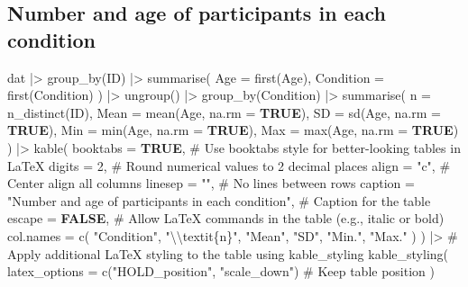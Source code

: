 \documentclass[
  bookmarksnumbered]{article}
\newenvironment{Shaded}{\begin{snugshade}}{\end{snugshade}}
\newcommand{\AttributeTok}[1]{\textcolor[rgb]{0.80,0.80,0.80}{#1}}
\newcommand{\CommentTok}[1]{\textcolor[rgb]{0.50,0.62,0.50}{#1}}
\newcommand{\ConstantTok}[1]{\textcolor[rgb]{0.86,0.64,0.64}{\textbf{#1}}}
\newcommand{\DecValTok}[1]{\textcolor[rgb]{0.86,0.86,0.80}{#1}}
\newcommand{\FunctionTok}[1]{\textcolor[rgb]{0.94,0.94,0.56}{#1}}
\newcommand{\NormalTok}[1]{\textcolor[rgb]{0.80,0.80,0.80}{#1}}
\newcommand{\SpecialCharTok}[1]{\textcolor[rgb]{0.86,0.64,0.64}{#1}}
\newcommand{\StringTok}[1]{\textcolor[rgb]{0.80,0.58,0.58}{#1}}
\begin{document}
\subsection{Number and age of participants in each condition}\label{number-and-age-of-participants-in-each-condition}

\begin{Shaded}
\begin{Highlighting}[]
\NormalTok{dat }\SpecialCharTok{|\textgreater{}}
  \FunctionTok{group\_by}\NormalTok{(ID) }\SpecialCharTok{|\textgreater{}}
  \FunctionTok{summarise}\NormalTok{(}
    \AttributeTok{Age =} \FunctionTok{first}\NormalTok{(Age),}
    \AttributeTok{Condition =} \FunctionTok{first}\NormalTok{(Condition)}
\NormalTok{  ) }\SpecialCharTok{|\textgreater{}}
  \FunctionTok{ungroup}\NormalTok{() }\SpecialCharTok{|\textgreater{}}
  \FunctionTok{group\_by}\NormalTok{(Condition) }\SpecialCharTok{|\textgreater{}}
  \FunctionTok{summarise}\NormalTok{(}
    \AttributeTok{n =} \FunctionTok{n\_distinct}\NormalTok{(ID),}
    \AttributeTok{Mean =} \FunctionTok{mean}\NormalTok{(Age, }\AttributeTok{na.rm =} \ConstantTok{TRUE}\NormalTok{),}
    \AttributeTok{SD =} \FunctionTok{sd}\NormalTok{(Age, }\AttributeTok{na.rm =} \ConstantTok{TRUE}\NormalTok{),}
    \AttributeTok{Min =} \FunctionTok{min}\NormalTok{(Age, }\AttributeTok{na.rm =} \ConstantTok{TRUE}\NormalTok{),}
    \AttributeTok{Max =} \FunctionTok{max}\NormalTok{(Age, }\AttributeTok{na.rm =} \ConstantTok{TRUE}\NormalTok{)}
\NormalTok{  ) }\SpecialCharTok{|\textgreater{}}
  \FunctionTok{kable}\NormalTok{(}
    \AttributeTok{booktabs =} \ConstantTok{TRUE}\NormalTok{, }\CommentTok{\# Use \textquotesingle{}booktabs\textquotesingle{} style for better{-}looking tables in LaTeX}
    \AttributeTok{digits =} \DecValTok{2}\NormalTok{, }\CommentTok{\# Round numerical values to 2 decimal places}
    \AttributeTok{align =} \StringTok{"c"}\NormalTok{, }\CommentTok{\# Center align all columns}
    \AttributeTok{linesep =} \StringTok{""}\NormalTok{, }\CommentTok{\# No lines between rows}
    \AttributeTok{caption =} \StringTok{"Number and age of participants in each condition"}\NormalTok{,}
    \CommentTok{\# Caption for the table}
    \AttributeTok{escape =} \ConstantTok{FALSE}\NormalTok{, }\CommentTok{\# Allow LaTeX commands in the table (e.g., italic or bold)}
    \AttributeTok{col.names =} \FunctionTok{c}\NormalTok{(}
      \StringTok{"Condition"}\NormalTok{,}
      \StringTok{"}\SpecialCharTok{\textbackslash{}\textbackslash{}}\StringTok{textit\{n\}"}\NormalTok{,}
      \StringTok{"Mean"}\NormalTok{,}
      \StringTok{"SD"}\NormalTok{,}
      \StringTok{"Min."}\NormalTok{,}
      \StringTok{"Max."}
\NormalTok{    )}
\NormalTok{  ) }\SpecialCharTok{|\textgreater{}}
  \CommentTok{\# Apply additional LaTeX styling to the table using \textquotesingle{}kable\_styling\textquotesingle{}}
  \FunctionTok{kable\_styling}\NormalTok{(}
    \AttributeTok{latex\_options =} \FunctionTok{c}\NormalTok{(}\StringTok{"HOLD\_position"}\NormalTok{, }\StringTok{"scale\_down"}\NormalTok{) }\CommentTok{\# Keep table position}
\NormalTok{  )}
\end{Highlighting}
\end{Shaded}
\end{document}
